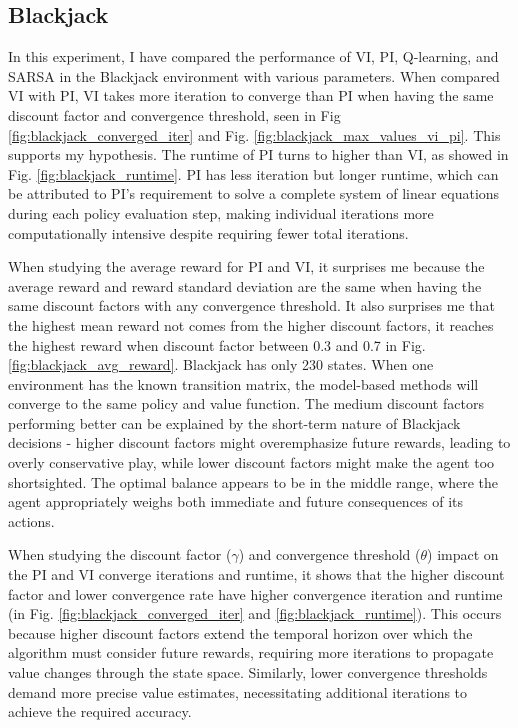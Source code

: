 \documentclass[conference]{IEEEtran}
\begin{document}
\subsection{Blackjack}
In this experiment, I have compared the performance of VI, PI, Q-learning, and SARSA in the Blackjack environment with various parameters. When compared VI with PI, VI takes more iteration to converge than PI when having the same discount factor and convergence threshold, seen in Fig \ref{fig:blackjack_converged_iter} and Fig. \ref{fig:blackjack_max_values_vi_pi}. This supports my hypothesis. The runtime of PI turns to higher than VI, as showed in Fig. 
\ref{fig:blackjack_runtime}. PI has less iteration but longer runtime, which can be attributed to PI's requirement to solve a complete system of linear equations during each policy evaluation step, making individual iterations more computationally intensive despite requiring fewer total iterations.

When studying the average reward for PI and VI, it surprises me because the average reward and reward standard deviation are the same when having the same discount factors with any convergence threshold. It also surprises me that the highest mean reward not comes from the higher discount factors, it reaches the highest reward when discount factor between 0.3 and 0.7 in Fig. \ref{fig:blackjack_avg_reward}. Blackjack has only 230 states. When one environment has the known transition matrix, the model-based methods will converge to the same policy and value function. The medium discount factors performing better can be explained by the short-term nature of Blackjack decisions - higher discount factors might overemphasize future rewards, leading to overly conservative play, while lower discount factors might make the agent too shortsighted. The optimal balance appears to be in the middle range, where the agent appropriately weighs both immediate and future consequences of its actions.

When studying the discount factor ($\gamma$) and convergence threshold ($\theta$) impact on the PI and VI converge iterations and runtime, it shows that the higher discount factor and lower convergence rate have higher convergence iteration and runtime (in Fig. \ref{fig:blackjack_converged_iter} and \ref{fig:blackjack_runtime}). This occurs because higher discount factors extend the temporal horizon over which the algorithm must consider future rewards, requiring more iterations to propagate value changes through the state space. Similarly, lower convergence thresholds demand more precise value estimates, necessitating additional iterations to achieve the required accuracy.
\end{document}
